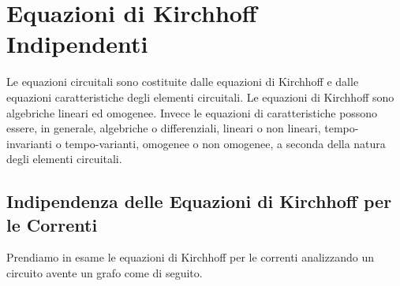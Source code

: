 \documentclass[a4paper]{report}
\begin{document}
\section{Equazioni di Kirchhoff Indipendenti}
Le equazioni circuitali sono costituite dalle equazioni di Kirchhoff e
dalle equazioni caratteristiche degli elementi circuitali. Le
equazioni di Kirchhoff sono algebriche lineari ed omogenee. Invece le
equazioni di caratteristiche possono essere, in generale, algebriche o
differenziali, lineari o non lineari, tempo-invarianti o
tempo-varianti, omogenee o non omogenee, a seconda della natura degli
elementi circuitali.

\subsection{Indipendenza delle Equazioni di Kirchhoff per le Correnti}
Prendiamo in esame le equazioni di Kirchhoff per le correnti
analizzando un circuito avente un grafo come di seguito.
\end{document}
